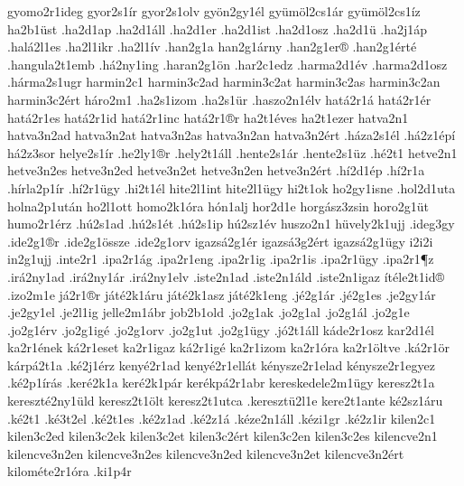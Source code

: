 {gyomo2r1ideg
gyor2s1^^edr
gyor2s1olv
gy^^f6n2gy1^^e9l
gy^^fcm^^f6l2cs1^^e1r
gy^^fcm^^f6l2cs1^^edz
ha2b1^^fcst
.ha2d1ap
.ha2d1^^e1ll
.ha2d1er
.ha2d1ist
.ha2d1osz
.ha2d1^^fc
.ha2j1^^e1p
.hal^^e12l1es
.ha2l1ikr
.ha2l1^^edv
.han2g1a
han2g1^^e1rny
.han2g1er^^ae
.han2g1^^e9rt^^e9
.hangula2t1emb
.h^^e12ny1ing
.haran2g1^^f6n
.har2c1edz
.harma2d1^^e9v
.harma2d1osz
.h^^e1rma2s1ugr
harmin2c1
harmin3c2ad
harmin3c2at
harmin3c2as
harmin3c2an
harmin3c2^^e9rt
h^^e1ro2m1
.ha2s1izom
.ha2s1^^fcr
.haszo2n1^^e9lv
hat^^e12r1^^e1
hat^^e12r1^^e9r
hat^^e12r1es
hat^^e12r1id
hat^^e12r1inc
hat^^e12r1^^aer
ha2t1^^e9ves
ha2t1ezer
hatva2n1
hatva3n2ad
hatva3n2at
hatva3n2as
hatva3n2an
hatva3n2^^e9rt
.h^^e1za2s1^^e9l
.h^^e12z1^^e9p^^ed
h^^e12z3sor
helye2s1^^edr
.he2ly1^^aer
.hely2t1^^e1ll
.hente2s1^^e1r
.hente2s1^^fcz
.h^^e92t1
hetve2n1
hetve3n2es
hetve3n2ed
hetve3n2et
hetve3n2en
hetve3n2^^e9rt
.h^^ed2d1^^e9p
.h^^ed2r1a
.h^^edrla2p1^^edr
.h^^ed2r1^^fcgy
.hi2t1^^e9l %
hite2l1int
hite2l1^^fcgy
hi2t1ok
ho2gy1isne
.hol2d1uta
holna2p1ut^^e1n
ho2l1ott
homo2k1^^f3ra
h^^f3n1alj
hor2d1e
horg^^e1sz3zsin
horo2g1^^fct
humo2r1^^e9rz
.h^^fa2s1ad
.h^^fa2s1^^e9t
.h^^fa2s1ip
h^^fa2sz1^^e9v
huszo2n1
h^^fcvely2k1ujj
.ideg3gy
.ide2g1^^aer
.ide2g1^^f6ssze
.ide2g1orv
igazs^^e12g1^^e9r
igazs^^e13g2^^e9rt
igazs^^e12g1^^fcgy
i2i2i %
in2g1ujj
.inte2r1
.ipa2r1^^e1g
.ipa2r1eng
.ipa2r1ig
.ipa2r1is
.ipa2r1^^fcgy
.ipa2r1^^b6z
.ir^^e12ny1ad
.ir^^e12ny1^^e1r
.ir^^e12ny1elv
.iste2n1ad
.iste2n1^^e1ld
.iste2n1igaz
^^edt^^e9le2t1id^^ae
.izo2m1e
j^^e12r1^^aer
j^^e1t^^e92k1^^e1ru
j^^e1t^^e92k1asz
j^^e1t^^e92k1eng
.j^^e92g1^^e1r
.j^^e92g1es
.je2gy1^^e1r
.je2gy1el
.je2l1ig
jelle2m1^^e1br
job2b1old
.jo2g1ak
.jo2g1al
.jo2g1^^e1l
.jo2g1e
.jo2g1^^e9rv
.jo2g1ig^^e9
.jo2g1orv
.jo2g1ut
.jo2g1^^fcgy
.j^^f32t1^^e1ll
k^^e1de2r1osz
kar2d1^^e9l
ka2r1^^e9nek
k^^e12r1eset
ka2r1igaz
k^^e12r1ig^^e9
ka2r1izom
ka2r1^^f3ra
ka2r1^^f6ltve
.k^^e12r1^^f6r
k^^e1rp^^e12t1a %
.k^^e92j1^^e9rz
keny^^e92r1ad
keny^^e92r1ell^^e1t
k^^e9nysze2r1elad
k^^e9nysze2r1egyez
.k^^e92p1^^edr^^e1s
.ker^^e92k1a
ker^^e92k1p^^e1r
ker^^e9kp^^e12r1abr
kereskedele2m1^^fcgy
keresz2t1a
kereszt^^e92ny1^^fcld
keresz2t1^^f6lt
keresz2t1utca
.kereszt^^fc2l1e
kere2t1ante
k^^e92sz1^^e1ru
.k^^e92t1
.k^^e93t2el
.k^^e92t1es
.k^^e92z1ad
.k^^e92z1^^e1
.k^^e9ze2n1^^e1ll
.k^^e9zi1gr
.k^^e92z1ir
kilen2c1
kilen3c2ed
kilen3c2ek
kilen3c2et
kilen3c2^^e9rt
kilen3c2en
kilen3c2es
kilencve2n1
kilencve3n2en
kilencve3n2es
kilencve3n2ed
kilencve3n2et
kilencve3n2^^e9rt
kilom^^e9te2r1^^f3ra
.ki1p4r
}
